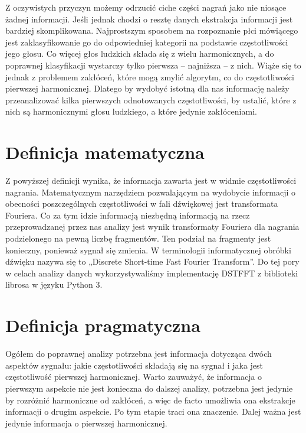 \documentclass[a4paper,12pt]{extarticle}
\begin{document}
Z oczywistych przyczyn możemy odrzucić ciche części nagrań jako nie niosące żadnej informacji. Jeśli jednak chodzi o resztę danych ekstrakcja informacji jest bardziej skomplikowana. Najprostszym sposobem na rozpoznanie płci mówiącego jest zaklasyfikowanie go do odpowiedniej kategorii na  podstawie częstotliwości jego głosu. Co więcej głos ludzkich składa się z wielu harmonicznych, a do poprawnej klasyfikacji wystarczy tylko pierwsza – najniższa – z nich. Wiąże się to jednak z problemem zakłóceń, które mogą zmylić algorytm, co do częstotliwości pierwszej harmonicznej. Dlatego by wydobyć istotną dla nas informację należy przeanalizować kilka pierwszych odnotowanych częstotliwości, by ustalić, które z nich są harmonicznymi głosu ludzkiego, a które jedynie zakłóceniami.

\section*{Definicja matematyczna}

Z powyższej definicji wynika, że informacja zawarta jest w widmie częstotliwości nagrania. Matematycznym narzędziem pozwalającym na wydobycie informacji o obecności poszczególnych częstotliwości w fali dźwiękowej jest transformata Fouriera. Co za tym idzie informacją niezbędną informacją na rzecz przeprowadzanej przez nas analizy jest wynik transformaty Fouriera dla nagrania podzielonego na pewną liczbę fragmentów. Ten podział na fragmenty jest konieczny, ponieważ sygnał się zmienia. W terminologii informatycznej obróbki dźwięku nazywa się to „Discrete Short-time Fast Fourier Transform”. Do tej pory w celach analizy danych wykorzystywaliśmy implementację DSTFFT z biblioteki librosa w języku Python 3.

\newpage

\section*{Definicja pragmatyczna}

Ogółem do poprawnej analizy potrzebna jest informacja dotycząca dwóch aspektów sygnału: jakie częstotliwości składają się na sygnał i jaka jest częstotliwość pierwszej harmonicznej. Warto zauważyć, że informacja o pierwszym aspekcie nie jest konieczna do dalszej analizy, potrzebna jest jedynie by rozróżnić harmoniczne od zakłóceń, a więc de facto umożliwia ona ekstrakcje informacji o drugim aspekcie. Po tym etapie traci ona znaczenie. Dalej ważna jest jedynie informacja o pierwszej harmonicznej.
\end{document}
